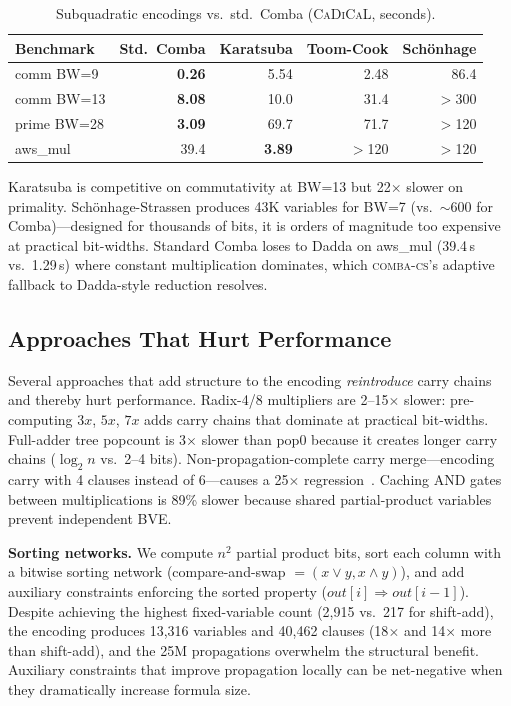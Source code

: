 \documentclass[a4paper]{ceurart}
\newcommand{\combacs}{\textsc{comba-cs}\xspace}
\newcommand{\cadical}{\textsc{CaDiCaL}\xspace}
\begin{document}
\begin{table}[ht]
\caption{Subquadratic encodings vs.\ std.\ Comba (\cadical, seconds).}
\label{tab:subquad}
\centering
\begin{tabular}{lrrrr}
\toprule
Benchmark & Std.\ Comba & Karatsuba & Toom-Cook & Sch\"onhage \\
\midrule
comm BW=9   & \textbf{0.26} & 5.54  & 2.48  & 86.4 \\
comm BW=13  & \textbf{8.08} & 10.0  & 31.4  & $>$300 \\
prime BW=28 & \textbf{3.09} & 69.7  & 71.7  & $>$120 \\
aws\_mul    & 39.4          & \textbf{3.89} & $>$120 & $>$120 \\
\bottomrule
\end{tabular}
\end{table}

Karatsuba is competitive on commutativity at BW=13 but 22$\times$
slower on primality. Sch\"onhage-Strassen produces 43K variables for
BW=7 (vs.\ ${\sim}$600 for Comba)---designed for thousands of bits,
it is orders of magnitude too expensive at practical bit-widths.
Standard Comba loses to Dadda on aws\_mul (39.4\,s vs.\ 1.29\,s) where
constant multiplication dominates, which \combacs's adaptive fallback
to Dadda-style reduction resolves.

\subsection{Approaches That Hurt Performance}

Several approaches that add structure to the encoding \emph{reintroduce}
carry chains and thereby hurt performance.
Radix-4/8 multipliers are 2--15$\times$ slower: pre-computing
$3x$, $5x$, $7x$ adds carry chains that dominate at practical
bit-widths. Full-adder tree popcount is 3$\times$ slower than
pop0 because it creates longer carry chains ($\log_2 n$ vs.\ 2--4
bits). Non-propagation-complete carry merge---encoding carry with
4 clauses instead of 6---causes a 25$\times$
regression~\cite{brain2016propagation}. Caching AND gates between
multiplications is 89\% slower because shared partial-product
variables prevent independent BVE.

\textbf{Sorting networks.} We compute $n^2$ partial product bits,
sort each column with a bitwise sorting network (compare-and-swap
$=(x \lor y, x \land y)$), and add auxiliary constraints enforcing
the sorted property ($\mathit{out}[i] \Rightarrow \mathit{out}[i{-}1]$).
Despite achieving the highest fixed-variable count (2{,}915 vs.\
217 for shift-add), the encoding produces 13{,}316 variables and
40{,}462 clauses (18$\times$ and 14$\times$ more than shift-add),
and the 25M propagations overwhelm the structural benefit.
Auxiliary constraints that improve propagation locally can be
net-negative when they dramatically increase formula size.
\end{document}
